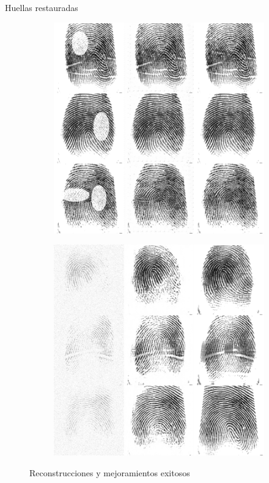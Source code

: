 \documentclass[12pt,aspectratio=169]{beamer}
\begin{document}
\begin{frame}{Huellas restauradas}

    \begin{figure}
        \begin{subfigure}{0.45\textwidth}
            \centering
            \includegraphics[scale=0.22]{figs/recons_1.png}
        \end{subfigure}
        \begin{subfigure}{0.45\textwidth}
            \centering
            \includegraphics[scale=0.22]{figs/recons_2.png}
        \end{subfigure}
        \caption{Reconstrucciones y mejoramientos exitosos}
    \end{figure}

\end{frame}
\end{document}
